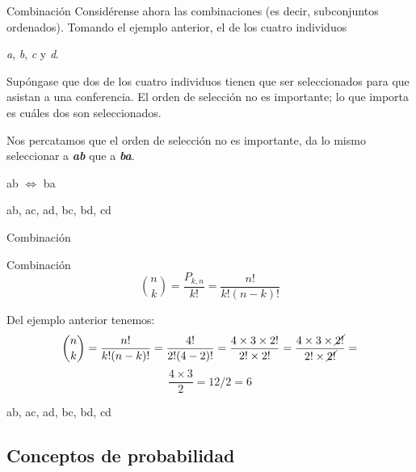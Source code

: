 \documentclass[11pt]{beamer}
\begin{document}
         \begin{frame}{Combinación}
            Considérense ahora las combinaciones (es decir, subconjuntos ordenados). Tomando el ejemplo anterior, el de los cuatro individuos\\ \begin{center}
                 \textit{a}, \textit{b}, \textit{c} y \textit{d}.
             \end{center}
             Supóngase que dos de los cuatro individuos tienen que ser seleccionados para que asistan a una conferencia. El orden de selección no es importante; lo que importa es cuáles dos son seleccionados.

             Nos percatamos que el orden de selección no es importante, da lo mismo seleccionar a \textit{\textbf{ab}} que a \textit{\textbf{ba}}.
             \begin{center}
                 ab $\Leftrightarrow$ ba
             \end{center}
             \begin{center}
                 ab, ac, ad, bc, bd, cd
             \end{center}
         \end{frame}

         \begin{frame}{Combinación}
             \begin{block}{Combinación}
               $$\binom{n}{k} = \dfrac{P_{k,n}}{k!} = \dfrac{n!}{k!(n-k)!} $$
             \end{block}
             Del ejemplo anterior tenemos:
             $$\binom{n}{k} = \dfrac{n!}{k!(n-k)!} = \dfrac{4!}{2!(4-2)!}= \dfrac{4 \times 3 \times 2!}{2! \times 2!}=\dfrac{4 \times 3 \times \cancel{2!}}{2! \times \cancel{2!}}=$$
             $$\dfrac{4 \times 3}{2} = 12/2 = 6$$
             \pause

             \begin{center}
                 ab, ac, ad, bc, bd, cd
             \end{center}
         \end{frame}


      \subsection*{Conceptos de probabilidad}
\end{document}
